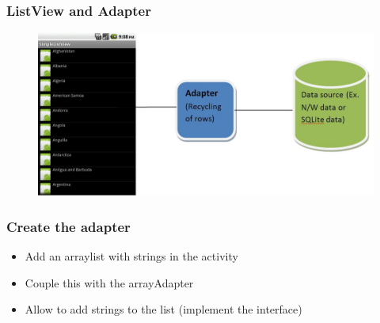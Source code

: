\documentclass{beamer}
\begin{document}
\begin{frame}
	\frametitle{ListView and Adapter}
	
	\begin{figure}
		\centering
			\includegraphics[width=1.00\textwidth]{img/adapter.jpg}
		\label{fig:adapter}
	\end{figure}
	
\end{frame}

\begin{frame}
	\frametitle{Create the adapter}
	
	\begin{itemize}
		\item Add an arraylist with strings in the activity
		\item Couple this with the arrayAdapter
		\item Allow to add strings to the list (implement the interface)
	\end{itemize}
\end{frame}


\end{document}
